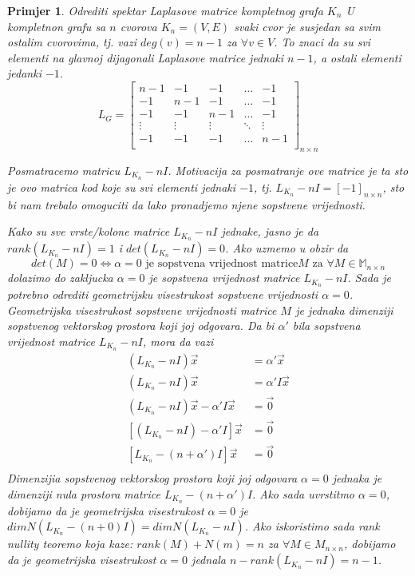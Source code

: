 \documentclass[11pt]{article}
\newtheorem{example}{Primjer}
\begin{document}
	\begin{example}{Odrediti spektar Laplasove matrice kompletnog grafa $K_n$}
	U kompletnon grafu sa $n$ cvorova $K_n =(V,E)$ svaki cvor je susjedan sa svim ostalim cvorovima, tj. vazi $deg(v)=n-1$ za $\forall v \in V$. To znaci da su svi elementi na glavnoj dijagonali Laplasove matrice jednaki $n-1$, a ostali elementi jedanki $-1$.
	\[
	L_G =
	\begin{bmatrix}
	n-1 & -1 & -1 & \dots & -1 \\
	-1 & n-1 & -1 & \dots & -1 \\
	-1 & -1 & n-1 & \dots & -1 \\
	\vdots & \vdots & \vdots & \ddots & \vdots \\
	-1 & -1 & -1 & \dots & n-1 \\
	\end{bmatrix}_{n \times n}
	\]
	
	Posmatracemo matricu $L_{K_n} - nI$. Motivacija za posmatranje ove matrice je ta sto je ovo matrica kod koje su svi elementi jednaki $-1$, tj. $L_{K_n} - nI = [-1]_{n \times n}$, sto bi nam trebalo omoguciti da lako pronadjemo njene sopstvene vrijednosti.
	
	Kako su sve vrste/kolone matrice $L_{K_n} - nI$ jednake, jasno je da $rank(L_{K_n} - nI) = 1$ i $det(L_{K_n} - nI) = 0$. Ako uzmemo u obzir da 
	\[
	det(M) = 0 \Leftrightarrow \alpha = 0 \text{ je sopstvena vrijednost matrice} M \text{ za } \forall M \in \mathbb{M}_{n \times n}
	\]
	dolazimo do zakljucka $\alpha = 0$ je sopstvena vrijednost matrice $L_{K_n} - nI$. 
	Sada je potrebno odrediti geometrijsku visestrukost sopstvene vrijednosti $\alpha = 0$. Geometrijska visestrukost sopstvene vrijednosti matrice $M$  je jednaka dimenziji sopstvenog vektorskog prostora koji joj odgovara.
	Da bi $\alpha'$ bila sopstvena vrijednost matrice $L_{K_n} - nI$, mora da vazi
	\[
	\begin{split}
	(L_{K_n} - nI)\vec{x} &= \alpha' \vec{x} \\
	(L_{K_n} - nI)\vec{x} &= \alpha' I \vec{x} \\
	(L_{K_n} - nI)\vec{x} - \alpha' I \vec{x} &= \vec{0}  \\
	[(L_{K_n} - nI) - \alpha' I] \vec{x} &= \vec{0}  \\
	[L_{K_n} - (n + \alpha') I] \vec{x} &= \vec{0}  \\
	\end{split}
	\]
	Dimenzijia sopstvenog vektorskog prostora koji joj odgovara $\alpha = 0$ jednaka je dimenziji nula prostora matrice $L_{K_n} - (n + \alpha') I$.
	Ako sada uvrstitmo $\alpha = 0$, dobijamo da je geometrijska visestrukost $\alpha = 0$ je $dim N(L_{K_n} - (n + 0) I) = dim N(L_{K_n} - n I)$. Ako iskoristimo sada rank nullity teoremo koja kaze: $rank(M) + N(m) = n$ za $\forall M \in M_{n \times n}$, dobijamo da je  geometrijska visestrukost $\alpha = 0$ jednala $n - rank(L_{K_n} - n I) = n - 1$.
	

\end{example}
\end{document}
